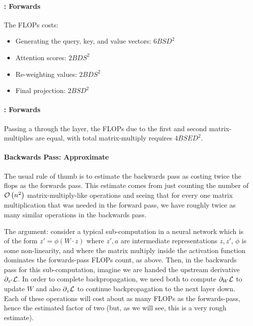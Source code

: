 \documentclass[11pt]{article}
\begin{document}
\paragraph{: Forwards }

The FLOPs costs:
\begin{itemize}
    \item  Generating the query, key, and value vectors: $ 6BSD ^{ 2 } $
    \item Attention scores:  $2BDS ^{ 2 }$
    \item Re-weighting values:  $2BDS ^{ 2 }$
    \item Final projection: $ 2BSD ^{ 2 } $
\end{itemize}

\paragraph{: Forwards}
Passing a  through the  layer, the FLOPs due to the
first and second matrix-multiplies are equal, with total matrix-multiply requires $ 4BSED ^{ 2 } $.

\paragraph{Backwards Pass: Approximate}


The usual rule of thumb is to estimate the backwards pass as costing twice the flops as the forwards
pass. This estimate comes from just counting the number of $ \mathcal{O} \left( n ^{ 2 } \right)$
matrix-multiply-like operations and seeing that for every one matrix multiplication that was needed
in the forward pass, we have roughly twice as many similar operations in the backwards pass.


The argument: consider a typical sub-computation in a neural network which is of the form $ z' =
\phi \left ( W \cdot z \right ) $ where $ z', a $ are intermediate representations $ z, z' $, $ \phi
$ is some non-linearity, and where the matrix multiply inside the activation function dominates the
forwards-pass FLOPs count, as above.  Then, in the backwards pass for this sub-computation, imagine
we are handed the upstream derivative $ \partial _{ z '  } \mathcal{L} $. In order to complete
backpropagation, we need both to compute $ \partial  _{ W }\mathcal{L}  $ to update $ W $ and also $
\partial  _{ z } \mathcal{L}  $ to continue backpropagation to the next layer down. Each of these operations
 will cost about as many FLOPs as the forwards-pass, hence the estimated factor of two (but, as
 we will see, this is a very rough estimate).
\end{document}
